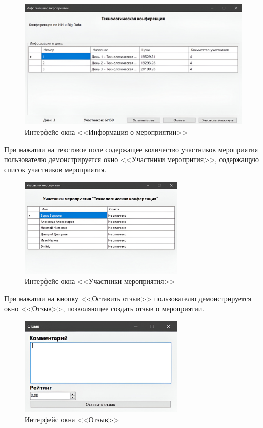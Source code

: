 \begin{figure}[h!]
	\centering
	\includegraphics[width=1\textwidth]{images/app-event-info.png}
	\caption{Интерфейс окна <<Информация о мероприятии>>} 
	\label{fig:app-event-info} 
\end{figure}

При нажатии на текстовое поле содержащее количество участников мероприятия пользователю демонстрируется окно <<Участники меропрития>>, содержащую список участников мероприятия.
\begin{figure}[h!]
	\centering
	\includegraphics[width=0.7\textwidth]{images/app-event-persons.png}
	\caption{Интерфейс окна <<Участники мероприятия>>} 
	\label{fig:app-event-persons} 
\end{figure}

При нажатии на кнопку <<Оставить отзыв>> пользователю демонстрируется окно <<Отзыв>>, позволяющее создать отзыв о мероприятии.
\begin{figure}[h!]
	\centering
	\includegraphics[width=0.7\textwidth]{images/app-event-feedback.png}
	\caption{Интерфейс окна <<Отзыв>>} 
	\label{fig:app-event-feedback} 
\end{figure}

